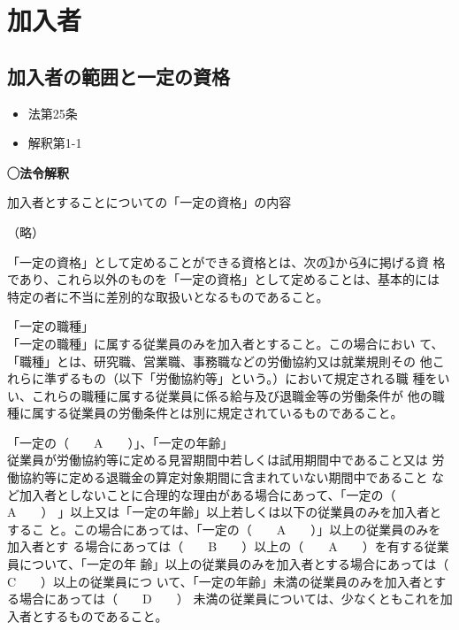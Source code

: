 \section{加入者}

\subsection{加入者の範囲と一定の資格}

\begin{InyouJobunbox}
  \begin{itemize}
    \item 法第25条
    \item 解釈第1-1
  \end{itemize}
\end{InyouJobunbox}

\begin{fillblank}[数理人試験 \ H28 \ 問題1 \ 設問2]
  \noindent \textbf{◯法令解釈}
  \begin{lawstructure}
    \begin{lawarticle}{}{}
       加入者とすることについての「一定の資格」の内容
      
      （略）

      「一定の資格」として定めることができる資格とは、次の\textcircled{1}から\textcircled{4}に掲げる資
      格であり、これら以外のものを「一定の資格」として定めることは、基本的には
      特定の者に不当に差別的な取扱いとなるものであること。

      「一定の職種」\\   \hspace*{1.0em}%
        「一定の職種」に属する従業員のみを加入者とすること。この場合におい
        て、「職種」とは、研究職、営業職、事務職などの労働協約又は就業規則その
        他これらに準ずるもの（以下「労働協約等」という。）において規定される職
        種をいい、これらの職種に属する従業員に係る給与及び退職金等の労働条件が
        他の職種に属する従業員の労働条件とは別に規定されているものであること。

      「一定の（　　A　　）」、「一定の年齢」\\      \hspace*{1.0em}%
      従業員が労働協約等に定める見習期間中若しくは試用期間中であること又は
      労働協約等に定める退職金の算定対象期間に含まれていない期間中であること
      など加入者としないことに合理的な理由がある場合にあって、「一定の（　　A　　）
      」以上又は「一定の年齢」以上若しくは以下の従業員のみを加入者とするこ
      と。この場合にあっては、「一定の（　　A　　）」以上の従業員のみを加入者とす
      る場合にあっては（　　B　　）以上の（　　A　　）を有する従業員について、「一定の年
      齢」以上の従業員のみを加入者とする場合にあっては（　　C　　）以上の従業員につ
      いて、「一定の年齢」未満の従業員のみを加入者とする場合にあっては（　　D　　）
      未満の従業員については、少なくともこれを加入者とするものであること。     


\end{lawarticle}
\end{lawstructure}
\end{fillblank}
